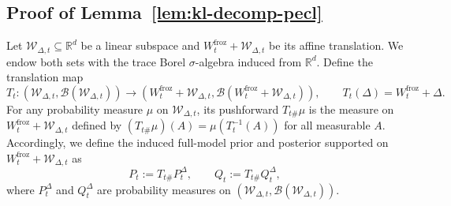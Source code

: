 \documentclass{article}
\theoremstyle{plain}
\theoremstyle{definition}
\theoremstyle{remark}
\begin{document}
\subsection{Proof of Lemma~\ref{lem:kl-decomp-pecl}}
\label{proof:Lemma1}

Let $\mathcal W_{\Delta,t}\subseteq\mathbb R^d$ be a linear subspace and $W_t^\mathrm{froz}+\mathcal W_{\Delta,t}$ be its affine translation. 
We endow both sets with the trace Borel $\sigma$-algebra induced from $\mathbb R^d$. 
Define the translation map
\[
T_t:(\mathcal W_{\Delta,t},\mathcal B(\mathcal W_{\Delta,t}))
\to (W_t^{\mathrm{froz}}+\mathcal W_{\Delta,t},\mathcal B(W_t^{\mathrm{froz}}+\mathcal W_{\Delta,t})),
\qquad
T_t(\Delta)=W_t^{\mathrm{froz}}+\Delta .
\]
For any probability measure $\mu$ on $\mathcal W_{\Delta,t}$, its pushforward
$T_{t\#}\mu$ is the measure on $W_t^{\mathrm{froz}}+\mathcal W_{\Delta,t}$
defined by $(T_{t\#}\mu)(A)=\mu(T_t^{-1}(A))$ for all measurable $A$.
Accordingly, we define the induced full-model prior and posterior supported on
$W_t^{\mathrm{froz}}+\mathcal W_{\Delta,t}$ as
\[
P_t := T_{t\#} P_t^\Delta,
\qquad
Q_t := T_{t\#} Q_t^\Delta,
\]
where $P_t^\Delta$ and $Q_t^\Delta$ are probability measures on
$(\mathcal W_{\Delta,t},\mathcal B(\mathcal W_{\Delta,t}))$.
\end{document}
